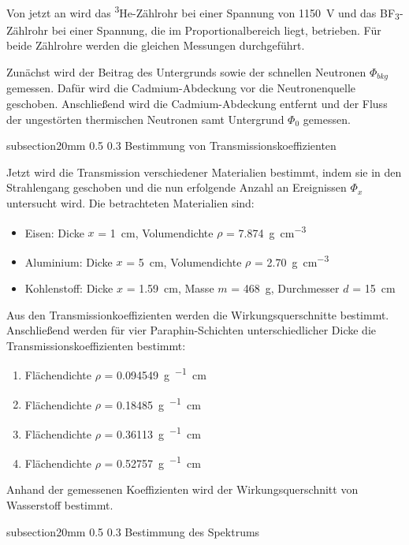 \documentclass[german, %
parskip=full, %
bibliography=totoc, %
]{scrartcl}
\makeatletter
\renewcommand\subsection{\@startsection 
   {subsection}{2}{0mm}%
   {0.5\baselineskip}%
   {0.3\baselineskip}%
   {\bfseries\sffamily\large}%
   }
\makeatother
\begin{document}
Von jetzt an wird das \textsuperscript{3}He-Zählrohr bei einer Spannung von \SI{1150}{\volt} und das BF\textsubscript{3}-Zählrohr bei einer Spannung, die im Proportionalbereich liegt, betrieben. Für beide Zählrohre werden die gleichen Messungen durchgeführt. 

Zunächst wird der Beitrag des Untergrunds sowie der schnellen Neutronen $\Phi_{bkg}$ gemessen. Dafür wird die Cadmium-Abdeckung vor die Neutronenquelle geschoben. Anschließend wird die Cadmium-Abdeckung entfernt und der Fluss der ungestörten thermischen Neutronen samt Untergrund $\Phi_0$ gemessen. 

\subsection{Bestimmung von Transmissionskoeffizienten}

Jetzt wird die Transmission verschiedener Materialien bestimmt, indem sie in den Strahlengang geschoben und die nun erfolgende Anzahl an Ereignissen $\Phi_x$untersucht wird. Die betrachteten Materialien sind:
\begin{itemize}
\item Eisen: Dicke $x$ = \SI{1}{\centi\meter}, Volumendichte $\rho$ = \SI{7.874}{\gram\per\cubic\centi\meter}
\item Aluminium: Dicke $x$ = \SI{5}{\centi\meter}, Volumendichte $\rho$ = \SI{2.70}{\gram\per\cubic\centi\meter}
\item Kohlenstoff: Dicke $x$ = \SI{1.59}{\centi\meter}, Masse $m$ = \SI{468}{\gram}, Durchmesser $d$ = \SI{15}{\centi\meter}
\end{itemize}
Aus den Transmissionkoeffizienten werden die Wirkungsquerschnitte bestimmt. Anschließend werden für vier Paraphin-Schichten unterschiedlicher Dicke die Transmissionskoeffizienten bestimmt:
\begin{enumerate}
\item Flächendichte $\rho$ = \SI{0.094549}{\gram\per\squared\centi\meter}
\item Flächendichte $\rho$ = \SI{0.18485}{\gram\per\squared\centi\meter}
\item Flächendichte $\rho$ = \SI{0.36113}{\gram\per\squared\centi\meter}
\item Flächendichte $\rho$ = \SI{0.52757}{\gram\per\squared\centi\meter}
\end{enumerate}
Anhand der gemessenen Koeffizienten wird der Wirkungsquerschnitt von Wasserstoff bestimmt.

\subsection{Bestimmung des Spektrums}
\end{document}
